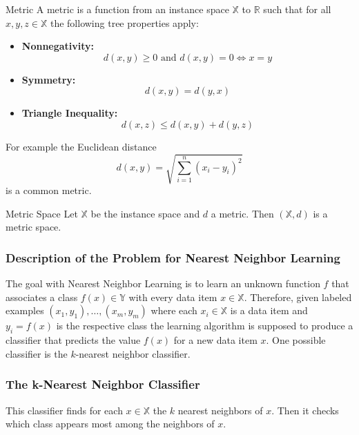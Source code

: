\documentclass{panikzettel}
\begin{document}
\begin{halfboxl}
\vspace{-\baselineskip}
\begin{defi}{Metric}
A metric is a function from an instance space $\mathbb{X}$ to $\mathbb{R}$ such that for all $x,y,z\in\mathbb{X}$ the following tree properties apply:
\begin{itemize}
\item \textbf{Nonnegativity:}
\[
d(x,y)\geq 0 \text{ and } d(x,y)=0 \iff x=y
\]
\item \textbf{Symmetry:}
\[
d(x,y)=d(y,x)
\]
\item \textbf{Triangle Inequality:}
\[
d(x,z)\leq d(x,y)+d(y,z)
\]
\end{itemize}
\end{defi}
\end{halfboxl}
\begin{halfboxr}
\vspace{-\baselineskip}
For example the Euclidean distance
\[
d(x,y)=\sqrt{\sum_{i=1}^n(x_i-y_i)^2}
\]
is a common metric.\\


\begin{defi}{Metric Space}
Let $\mathbb{X}$ be the instance space and $d$ a metric. Then $(\mathbb{X}, d)$ is a metric space.
\end{defi}
\end{halfboxr}


\subsubsection{Description of the Problem for Nearest Neighbor Learning}
The goal with Nearest Neighbor Learning is to learn an unknown function $f$ that associates a class $f(x)\in\mathbb{Y}$ with every data item $x\in \mathbb{X}$. Therefore, given labeled examples $(x_1,y_1),\ldots,(x_m,y_m)$ where each $x_i\in\mathbb{X}$ is a data item and $y_i=f(x)$ is the respective class the learning algorithm is supposed to produce a classifier that predicts the value $f(x)$ for a new data item $x$. One possible classifier is the $k$-nearest neighbor classifier.

\subsubsection{The k-Nearest Neighbor Classifier}
This classifier finds for each $x\in\mathbb{X}$ the $k$ nearest neighbors of $x$. Then it checks which class appears most among the neighbors of $x$.
\end{document}
